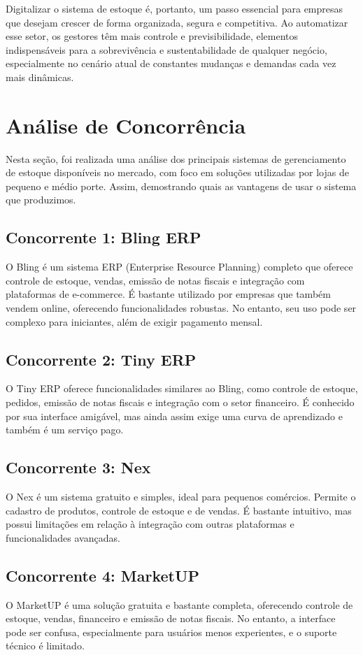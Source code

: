 \documentclass[
	12pt,				%
	openany,			%
	twoside,			%
	a4paper,			%
	english,			%
	brazil				%
	]{abntex2}
\begin{document}
Digitalizar o sistema de estoque é, portanto, um passo essencial para empresas que desejam crescer de forma organizada, segura e competitiva. Ao automatizar esse setor, os gestores têm mais controle e previsibilidade, elementos indispensáveis para a sobrevivência e sustentabilidade de qualquer negócio, especialmente no cenário atual de constantes mudanças e demandas cada vez mais dinâmicas.

\section{Análise de Concorrência}

Nesta seção, foi realizada uma análise dos principais sistemas de gerenciamento de estoque disponíveis no mercado, com foco em soluções utilizadas por lojas de pequeno e médio porte. Assim, demostrando quais as vantagens de usar o sistema que produzimos.

\subsection{Concorrente 1: Bling ERP}
O Bling é um sistema ERP (Enterprise Resource Planning) completo que oferece controle de estoque, vendas, emissão de notas fiscais e integração com plataformas de e-commerce. É bastante utilizado por empresas que também vendem online, oferecendo funcionalidades robustas. No entanto, seu uso pode ser complexo para iniciantes, além de exigir pagamento mensal.

\subsection{Concorrente 2: Tiny ERP}
O Tiny ERP oferece funcionalidades similares ao Bling, como controle de estoque, pedidos, emissão de notas fiscais e integração com o setor financeiro. É conhecido por sua interface amigável, mas ainda assim exige uma curva de aprendizado e também é um serviço pago.

\subsection{Concorrente 3: Nex}
O Nex é um sistema gratuito e simples, ideal para pequenos comércios. Permite o cadastro de produtos, controle de estoque e de vendas. É bastante intuitivo, mas possui limitações em relação à integração com outras plataformas e funcionalidades avançadas.

\subsection{Concorrente 4: MarketUP}
O MarketUP é uma solução gratuita e bastante completa, oferecendo controle de estoque, vendas, financeiro e emissão de notas fiscais. No entanto, a interface pode ser confusa, especialmente para usuários menos experientes, e o suporte técnico é limitado.
\end{document}
